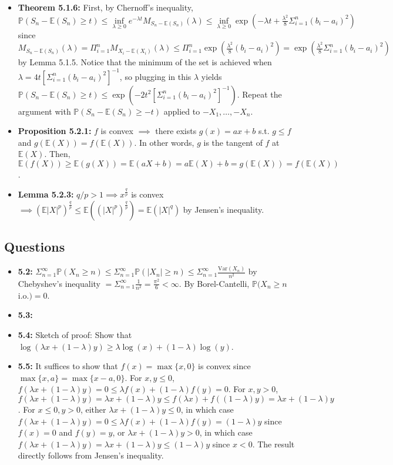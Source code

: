 \documentclass[12pt]{article}
\newcommand{\E}{\mathbb{E}}
\newcommand{\p}{\mathbb{P}}
\newcommand{\V}{\text{Var}}
\begin{document}
\begin{itemize}
    \item \textbf{Theorem 5.1.6:} First, by Chernoff's inequality, $\p(S_n - \E(S_n) \geq t) \leq \inf \limits_{\lambda \geq 0} e^{-\lambda t} M_{S_n - \E(S_n)}(\lambda) \leq \inf \limits_{\lambda \geq 0} \exp(-\lambda t + \frac{\lambda^2}{8} \Sigma_{i=1}^n (b_i - a_i)^2)$ since $M_{S_n - \E(S_n)}(\lambda) = \Pi_{i=1}^n M_{X_i - \E(X_i)}(\lambda) \leq \Pi_{i=1}^n \exp(\frac{\lambda^2}{8} (b_i - a_i)^2) = \exp(\frac{\lambda^2}{8} \Sigma_{i=1}^n (b_i - a_i)^2)$ by Lemma 5.1.5. Notice that the minimum of the set is achieved when $\lambda = 4t[\Sigma_{i=1}^n (b_i - a_i)^2]^{-1}$, so plugging in this $\lambda$ yields $\p(S_n - \E(S_n) \geq t) \leq \exp(-2t^2 [\Sigma_{i=1}^n (b_i - a_i)^2]^{-1})$. Repeat the argument with $\p(S_n - \E(S_n) \geq -t)$ applied to $-X_1, \ldots, -X_n$.
    \item \textbf{Proposition 5.2.1:} $f$ is convex $\implies$ there exists $g(x) = ax + b$ s.t. $g \leq f$ and $g(\E(X)) = f(\E(X))$. In other words, $g$ is the tangent of $f$ at $\E(X)$. Then, $\E(f(X)) \geq \E(g(X)) = \E(aX + b) = a\E(X) + b = g(\E(X)) = f(\E(X))$.
    \item \textbf{Lemma 5.2.3:} $q / p > 1 \implies x^{\frac{q}{p}}$ is convex $\implies (\E|X|^p)^{\frac{q}{p}} \leq \E((|X|^p)^{\frac{q}{p}}) = \E(|X|^q)$ by Jensen's inequality.
\end{itemize}

\subsection*{Questions}
\begin{itemize}
    \item \textbf{5.2:} $\Sigma_{n=1}^\infty \p(X_n \geq n) \leq \Sigma_{n=1}^\infty \p(|X_n| \geq n) \leq \Sigma_{n=1}^\infty \frac{\V(X_n)}{n^2}$ by Chebyshev's inequality $= \Sigma_{n=1}^\infty \frac{1}{n^2} = \frac{\pi^2}{6} < \infty$. By Borel-Cantelli, $\p(X_n \geq n$ i.o.$) = 0$.
    \item \textbf{5.3:}
    \item \textbf{5.4:} Sketch of proof: Show that $\log(\lambda x + (1 - \lambda)y) \geq \lambda\log(x) + (1 - \lambda)\log(y)$.
    \item \textbf{5.5:} It suffices to show that $f(x) = \max\{x, 0\}$ is convex since $\max\{x, a\} = \max\{x - a, 0\}$. For $x, y \leq 0$, $f(\lambda x + (1 - \lambda)y) = 0 \leq \lambda f(x) + (1 - \lambda)f(y) = 0$. For $x, y > 0$, $f(\lambda x + (1 - \lambda)y) = \lambda x + (1 - \lambda)y \leq f(\lambda x) + f((1 - \lambda)y) = \lambda x + (1 - \lambda)y$. For $x \leq 0, y > 0$, either $\lambda x + (1 - \lambda)y \leq 0$, in which case $f(\lambda x + (1 - \lambda)y) = 0 \leq \lambda f(x) + (1 - \lambda)f(y) = (1 - \lambda)y$ since $f(x) = 0$ and $f(y) = y$, or $\lambda x + (1 - \lambda)y > 0$, in which case $f(\lambda x + (1 - \lambda)y) = \lambda x + (1 - \lambda)y \leq (1 - \lambda)y$ since $x < 0$. The result directly follows from Jensen's inequality.
\end{itemize}
\end{document}

